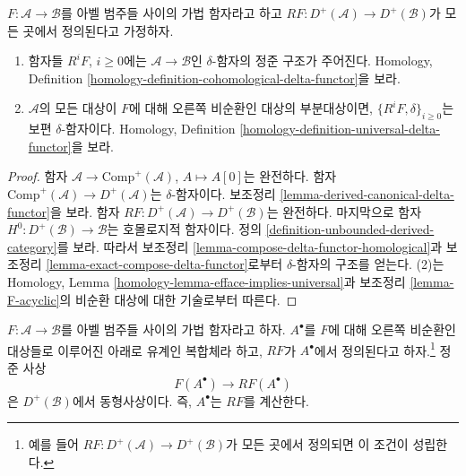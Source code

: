 \begin{lemma}
\label{lemma-right-derived-delta-functor}
$F : \mathcal{A} \to \mathcal{B}$를 아벨 범주들 사이의 가법 함자라고
하고 $RF : D^{+}(\mathcal{A}) \to D^{+}(\mathcal{B})$가 모든 곳에서
정의된다고 가정하자.
\begin{enumerate}
\item 함자들 $R^iF$, $i \geq 0$에는 $\mathcal{A} \to \mathcal{B}$인
$\delta$-함자의 정준 구조가 주어진다. Homology, Definition
\ref{homology-definition-cohomological-delta-functor}을 보라.
\item $\mathcal{A}$의 모든 대상이 $F$에 대해 오른쪽 비순환인 대상의
부분대상이면, $\{R^iF, \delta\}_{i \geq 0}$는 보편 $\delta$-함자이다.
Homology, Definition \ref{homology-definition-universal-delta-functor}을 보라.
\end{enumerate}
\end{lemma}

\begin{proof}
함자 $\mathcal{A} \to \text{Comp}^{+}(\mathcal{A})$,
$A \mapsto A[0]$는 완전하다. 함자
$\text{Comp}^{+}(\mathcal{A}) \to D^{+}(\mathcal{A})$는
$\delta$-함자이다. 보조정리
\ref{lemma-derived-canonical-delta-functor}을 보라.
함자 $RF : D^{+}(\mathcal{A}) \to D^{+}(\mathcal{B})$는 완전하다.
마지막으로 함자 $H^0 : D^{+}(\mathcal{B}) \to \mathcal{B}$는
호몰로지적 함자이다. 정의
\ref{definition-unbounded-derived-category}를 보라.
따라서 보조정리 \ref{lemma-compose-delta-functor-homological}과
보조정리 \ref{lemma-exact-compose-delta-functor}로부터
$\delta$-함자의 구조를 얻는다.
(2)는 Homology, Lemma \ref{homology-lemma-efface-implies-universal}과
보조정리 \ref{lemma-F-acyclic}의 비순환 대상에 대한 기술로부터 따른다.
\end{proof}

\begin{lemma}
\label{lemma-leray-acyclicity}
$F : \mathcal{A} \to \mathcal{B}$를 아벨 범주들 사이의 가법 함자라고
하자. $A^\bullet$를 $F$에 대해 오른쪽 비순환인 대상들로 이루어진
아래로 유계인 복합체라 하고, $RF$가 $A^\bullet$에서 정의된다고
하자.\footnote{예를 들어 $RF : D^{+}(\mathcal{A}) \to D^{+}(\mathcal{B})$가
모든 곳에서 정의되면 이 조건이 성립한다.}
정준 사상
$$
F(A^\bullet) \longrightarrow RF(A^\bullet)
$$
은 $D^{+}(\mathcal{B})$에서 동형사상이다. 즉, $A^\bullet$는
$RF$를 계산한다.
\end{lemma}


